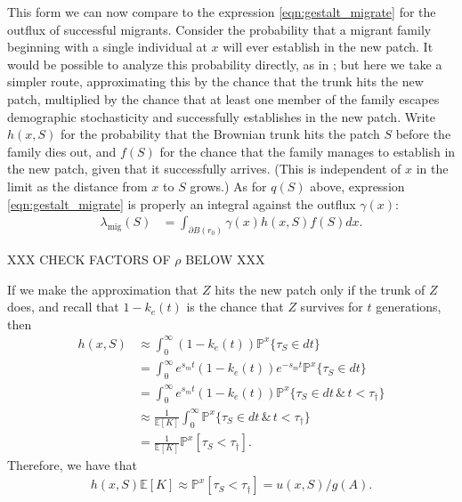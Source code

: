 \documentclass{article}
\newcommand{\citet}[1]{\cite{#1}}
\renewcommand{\P}{\mathbb{P}}
\newcommand{\E}{\mathbb{E}}
\newcommand{\migrate}{\lambda_\text{mig}}
\begin{document}
This form we can now compare to 
the expression \eqref{eqn:gestalt_migrate} for the outflux of successful migrants.
Consider the probability that a migrant family beginning with a single individual at $x$ will ever establish in the new patch.
It would be possible to analyze this probability directly,
as in \citet{barton1987establishment};
but here we take a simpler route, 
approximating this by the chance that the trunk hits the new patch,
multiplied by the chance that at least one member of the family escapes demographic stochasticity
and successfully establishes in the new patch.
Write $h(x,S)$ for the probability that the Brownian trunk hits the patch $S$
before the family dies out,
and $f(S)$ for the chance that the family manages to establish in the new patch,
given that it successfully arrives.
(This is independent of $x$ in the limit as the distance from $x$ to $S$ grows.)
As for $q(S)$ above, expression \eqref{eqn:gestalt_migrate} is properly an integral against the outflux $\gamma(x)$:
\begin{align}\label{eqn:migrate_integral}
  \migrate(S) &= \int_{\partial B(r_0)} \gamma(x) h(x,S) f(S) dx .
\end{align}

XXX CHECK FACTORS OF $\rho$ BELOW XXX

If we make the approximation that $Z$ hits the new patch only if the trunk of $Z$ does,
and recall that $1-k_e(t)$ is the chance that $Z$ survives for $t$ generations,
then 
\begin{align}
    h(x,S) &\approx \int_0^\infty (1-k_e(t)) \P^x\{ \tau_S \in dt \} \\
           &= \int_0^\infty e^{s_m t} (1-k_e(t)) e^{- s_m t } \P^x\{ \tau_S \in dt \} \\
           &=\int_0^\infty e^{s_m t} (1-k_e(t)) \P^x\{ \tau_S \in dt \, \& \, t < \tau_\dagger \} \\
           &\approx \frac{1}{\E[K]} \int_0^\infty \P^x\{ \tau_S \in dt \, \& \, t < \tau_\dagger \} \\
    &= \frac{1}{\E[K]} \P^x[ \tau_S < \tau_\dagger ] .
\end{align}
Therefore, we have that
\begin{align} \label{eqn:boils_downto}
    h(x,S) \E[K] 
    \approx \P^x[ \tau_S < \tau_\dagger ] 
    = u(x,S) / g(A) .
\end{align}
\end{document}
